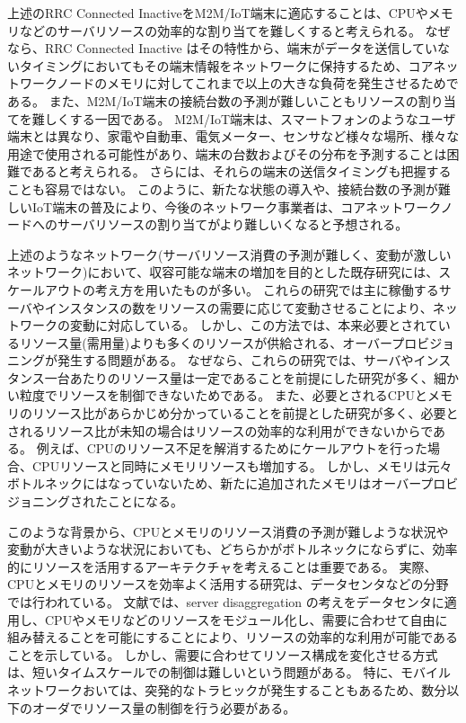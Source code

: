 \documentclass[a4j]{ujarticle}
\begin{document}
上述のRRC Connected InactiveをM2M/IoT端末に適応することは、CPUやメモリなどのサーバリソースの効率的な割り当てを難しくすると考えられる。
なぜなら、RRC Connected Inactive	はその特性から、端末がデータを送信していないタイミングにおいてもその端末情報をネットワークに保持するため、コアネットワークノードのメモリに対してこれまで以上の大きな負荷を発生させるためである。
また、M2M/IoT端末の接続台数の予測が難しいこともリソースの割り当てを難しくする一因である。
M2M/IoT端末は、スマートフォンのようなユーザ端末とは異なり、家電や自動車、電気メーター、センサなど様々な場所、様々な用途で使用される可能性があり、端末の台数およびその分布を予測することは困難であると考えられる。
さらには、それらの端末の送信タイミングも把握することも容易ではない。
このように、新たな状態の導入や、接続台数の予測が難しいIoT端末の普及により、今後のネットワーク事業者は、コアネットワークノードへのサーバリソースの割り当てがより難しいくなると予想される。

上述のようなネットワーク(サーバリソース消費の予測が難しく、変動が激しいネットワーク)において、収容可能な端末の増加を目的とした既存研究には、スケールアウトの考え方を用いたものが多い。
これらの研究では主に稼働するサーバやインスタンスの数をリソースの需要に応じて変動させることにより、ネットワークの変動に対応している。
しかし、この方法では、本来必要とされているリソース量(需用量)よりも多くのリソースが供給される、オーバープロビジョニングが発生する問題がある。
なぜなら、これらの研究では、サーバやインスタンス一台あたりのリソース量は一定であることを前提にした研究が多く、細かい粒度でリソースを制御できないためである。
また、必要とされるCPUとメモリのリソース比があらかじめ分かっていることを前提とした研究が多く、必要とされるリソース比が未知の場合はリソースの効率的な利用ができないからである。
例えば、CPUのリソース不足を解消するためにケールアウトを行った場合、CPUリソースと同時にメモリリソースも増加する。
しかし、メモリは元々ボトルネックにはなっていないため、新たに追加されたメモリはオーバープロビジョニングされたことになる。


このような背景から、CPUとメモリのリソース消費の予測が難しような状況や変動が大きいような状況においても、どちらかがボトルネックにならずに、効率的にリソースを活用するアーキテクチャを考えることは重要である。
実際、CPUとメモリのリソースを効率よく活用する研究は、データセンタなどの分野では行われている。
文献\cite{TechnoEconomicFrameworkforCloudInfrastructureACostStudyofResourceDisaggregation}では、server disaggregation の考えをデータセンタに適用し、CPUやメモリなどのリソースをモジュール化し、需要に合わせて自由に組み替えることを可能にすることにより、リソースの効率的な利用が可能であることを示している。
しかし、需要に合わせてリソース構成を変化させる方式は、短いタイムスケールでの制御は難しいという問題がある。
特に、モバイルネットワークおいては、突発的なトラヒックが発生することもあるため、数分以下のオーダでリソース量の制御を行う必要がある。
\end{document}
